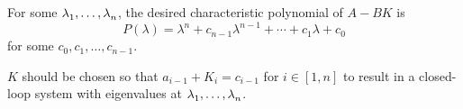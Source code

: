 \documentclass[11pt]{article}
\begin{document}
For some \(\lambda_{1}^{\*}, \dots, \lambda_{n}^{\*}\), the desired characteristic polynomial of \(A-BK\) is
$$ P(\lambda) = \lambda^{n} + c_{n-1} \lambda^{n-1} + \cdots + c_{1} \lambda + c_{0} $$
for some \(c_{0}, c_{1} ,\dots, c_{n-1}\).

\(K\) should be chosen so that \(a_{i-1} + K_{i} = c_{i-1}\) for \(i \in [1, n]\)
to result in a closed-loop system with eigenvalues at \(\lambda_{1}^{\*}, \dots, \lambda_{n}^{\*}\).
\end{document}

